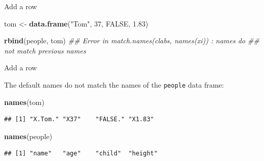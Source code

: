 \documentclass[ignorenonframetext,]{beamer}
\newenvironment{Shaded}{\begin{snugshade}}{\end{snugshade}}
\newcommand{\CommentTok}[1]{\textcolor[rgb]{0.56,0.35,0.01}{\textit{#1}}}
\newcommand{\DecValTok}[1]{\textcolor[rgb]{0.00,0.00,0.81}{#1}}
\newcommand{\FloatTok}[1]{\textcolor[rgb]{0.00,0.00,0.81}{#1}}
\newcommand{\KeywordTok}[1]{\textcolor[rgb]{0.13,0.29,0.53}{\textbf{#1}}}
\newcommand{\NormalTok}[1]{#1}
\newcommand{\OtherTok}[1]{\textcolor[rgb]{0.56,0.35,0.01}{#1}}
\newcommand{\StringTok}[1]{\textcolor[rgb]{0.31,0.60,0.02}{#1}}
\begin{document}
\begin{frame}[fragile]{Add a row}
\protect\hypertarget{add-a-row}{}

\begin{Shaded}
\begin{Highlighting}[]
\NormalTok{tom <-}\StringTok{ }\KeywordTok{data.frame}\NormalTok{(}\StringTok{"Tom"}\NormalTok{, }\DecValTok{37}\NormalTok{, }\OtherTok{FALSE}\NormalTok{, }\FloatTok{1.83}\NormalTok{)}
\end{Highlighting}
\end{Shaded}

\begin{Shaded}
\begin{Highlighting}[]
\KeywordTok{rbind}\NormalTok{(people, tom)}
\CommentTok{## Error in match.names(clabs, names(xi)) : names do}
\CommentTok{## not match previous names}
\end{Highlighting}
\end{Shaded}

\end{frame}

\begin{frame}[fragile]{Add a row}
\protect\hypertarget{add-a-row-1}{}

The default names do not match the names of the \texttt{people} data
frame:

\begin{Shaded}
\begin{Highlighting}[]
\KeywordTok{names}\NormalTok{(tom)}
\end{Highlighting}
\end{Shaded}

\begin{verbatim}
## [1] "X.Tom." "X37"    "FALSE." "X1.83"
\end{verbatim}

\begin{Shaded}
\begin{Highlighting}[]
\KeywordTok{names}\NormalTok{(people)}
\end{Highlighting}
\end{Shaded}

\begin{verbatim}
## [1] "name"   "age"    "child"  "height"
\end{verbatim}

\end{frame}
\end{document}
